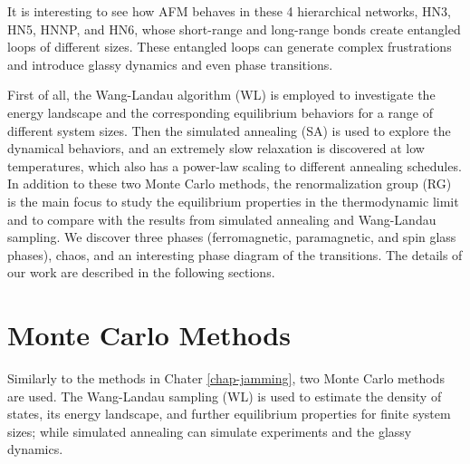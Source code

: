 It is interesting to see how AFM behaves in these 4 hierarchical networks, HN3, HN5, HNNP, and HN6, whose short-range and long-range bonds create entangled loops of different sizes. These entangled loops can generate complex frustrations and introduce glassy dynamics and even phase transitions. 

First of all,  the Wang-Landau algorithm (WL) is employed to investigate the energy landscape and the corresponding equilibrium behaviors for a range of different system sizes. Then the simulated annealing (SA) is used to explore the dynamical behaviors, and an extremely slow relaxation is discovered at low temperatures, which also has a power-law scaling to different annealing schedules.  In addition to these two Monte Carlo methods, the renormalization group (RG) is the main focus to study the equilibrium properties in the thermodynamic limit and to compare with the results from simulated annealing and Wang-Landau sampling. We discover three phases (ferromagnetic, paramagnetic, and spin glass phases), chaos, and an interesting phase diagram of the transitions. The details of our work are described in the following sections.


\section{Monte Carlo Methods}
\label{sec:afm-mc}
Similarly to the methods in Chater \ref{chap-jamming}, two Monte Carlo methods are used. The Wang-Landau sampling (WL) is used to estimate the density of states, its energy landscape, and further equilibrium properties for finite system sizes; while simulated annealing can simulate experiments and the glassy dynamics.
 
